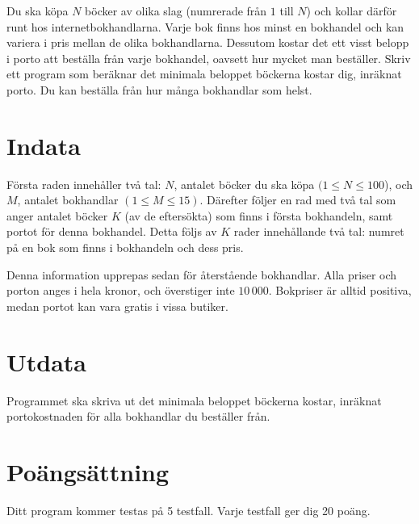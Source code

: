 Du ska köpa $N$ böcker av olika slag (numrerade från $1$ till $N$) och kollar därför runt hos internetbokhandlarna.
Varje bok finns hos minst en bokhandel och kan variera i pris mellan de olika bokhandlarna.
Dessutom kostar det ett visst belopp i porto att beställa från varje bokhandel, oavsett hur mycket man beställer.
Skriv ett program som beräknar det minimala beloppet böckerna kostar dig, inräknat porto.
Du kan beställa från hur många bokhandlar som helst.

\section*{Indata}
Första raden innehåller två tal: $N$, antalet böcker du ska köpa $(1 \le N \le 100$), och $M$, antalet bokhandlar $(1 \le M \le 15)$.
Därefter följer en rad med två tal som anger antalet böcker $K$ (av de eftersökta) som finns i första bokhandeln, samt portot för denna bokhandel.
Detta följs av $K$ rader innehållande två tal: numret på en bok som finns i bokhandeln och dess pris.

Denna information upprepas sedan för återstående bokhandlar.
Alla priser och porton anges i hela kronor, och överstiger inte $10\,000$.
Bokpriser är alltid positiva, medan portot kan vara gratis i vissa butiker.

\section*{Utdata}
Programmet ska skriva ut det minimala beloppet böckerna kostar, inräknat portokostnaden för alla bokhandlar du beställer från.

\section*{Poängsättning}
Ditt program kommer testas på 5 testfall.
Varje testfall ger dig 20 poäng.

